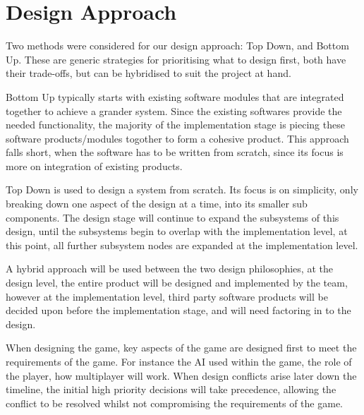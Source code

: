\section{Design Approach}


Two methods were considered for our design approach: Top Down, and Bottom Up.
These are generic strategies for prioritising what to design first, both have their trade-offs, but can be hybridised to suit the project at hand.

Bottom Up typically starts with existing software modules that are integrated together to achieve a grander system.
Since the existing softwares provide the needed functionality, the majority of the implementation stage is piecing these software products/modules togother to form a cohesive product.
This approach falls short, when the software has to be written from scratch, since its focus is more on integration of existing products.

Top Down is used to design a system from scratch.
Its focus is on simplicity, only breaking down one aspect of the design at a time, into its smaller sub components.
The design stage will continue to expand the subsystems of this design, until the subsystems begin to overlap with the implementation level, at this point, all further subsystem nodes are expanded at the implementation level.

A hybrid approach will be used between the two design philosophies, at the design level, the  entire product will be designed and implemented by the team, however at the implementation level, third party software products will be decided upon before the implementation stage, and will need factoring in to the design.

When designing the game, key aspects of the game are designed first to meet the requirements of the game. For instance the AI used within the game, the role of the player, how multiplayer will work.
When design conflicts arise later down the timeline, the initial high priority decisions will take precedence, allowing the conflict to be resolved whilst not compromising the requirements of the game.




